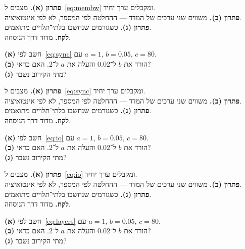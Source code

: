 \begin{keybox}[frametitle={פתרון 6},nobreak=true]
\textbf{פתרון (א).} מצבים ל~\eqref{eq:membw} ומקבלים ערך יחיד.\\[2pt]
\textbf{פתרון (ב).} משווים שני ערכים של המדד — ההחלטה לפי המספר, לא לפי אינטואיציה.\\[2pt]
\textbf{פתרון (ג).} כשגורמים שנחשבו בלתי־תלויים מתואמים.\\[2pt]
\textbf{לקח.} מדוד דרך הנוסחה.
\end{keybox}


\begin{exbox}[frametitle={תרגיל 7 — \en{mutex}}]
\textbf{(א)} חשב לפי~\eqref{eq:sync} עם $a=1$, $b=0.05$, $c=80$.\\[3pt]
\textbf{(ב)} הורד את $b$ ל־$0.02$ והעלה את $a$ ל־$2$. האם כדאי?\\[3pt]
\textbf{(ג)} מתי הקירוב נשבר?
\end{exbox}

\begin{keybox}[frametitle={פתרון 7},nobreak=true]
\textbf{פתרון (א).} מצבים ל~\eqref{eq:sync} ומקבלים ערך יחיד.\\[2pt]
\textbf{פתרון (ב).} משווים שני ערכים של המדד — ההחלטה לפי המספר, לא לפי אינטואיציה.\\[2pt]
\textbf{פתרון (ג).} כשגורמים שנחשבו בלתי־תלויים מתואמים.\\[2pt]
\textbf{לקח.} מדוד דרך הנוסחה.
\end{keybox}


\begin{exbox}[frametitle={תרגיל 8 — \en{DMA}}]
\textbf{(א)} חשב לפי~\eqref{eq:io} עם $a=1$, $b=0.05$, $c=80$.\\[3pt]
\textbf{(ב)} הורד את $b$ ל־$0.02$ והעלה את $a$ ל־$2$. האם כדאי?\\[3pt]
\textbf{(ג)} מתי הקירוב נשבר?
\end{exbox}

\begin{keybox}[frametitle={פתרון 8},nobreak=true]
\textbf{פתרון (א).} מצבים ל~\eqref{eq:io} ומקבלים ערך יחיד.\\[2pt]
\textbf{פתרון (ב).} משווים שני ערכים של המדד — ההחלטה לפי המספר, לא לפי אינטואיציה.\\[2pt]
\textbf{פתרון (ג).} כשגורמים שנחשבו בלתי־תלויים מתואמים.\\[2pt]
\textbf{לקח.} מדוד דרך הנוסחה.
\end{keybox}


\begin{exbox}[frametitle={תרגיל 9 — \en{OSI}}]
\textbf{(א)} חשב לפי~\eqref{eq:layers} עם $a=1$, $b=0.05$, $c=80$.\\[3pt]
\textbf{(ב)} הורד את $b$ ל־$0.02$ והעלה את $a$ ל־$2$. האם כדאי?\\[3pt]
\textbf{(ג)} מתי הקירוב נשבר?
\end{exbox}

